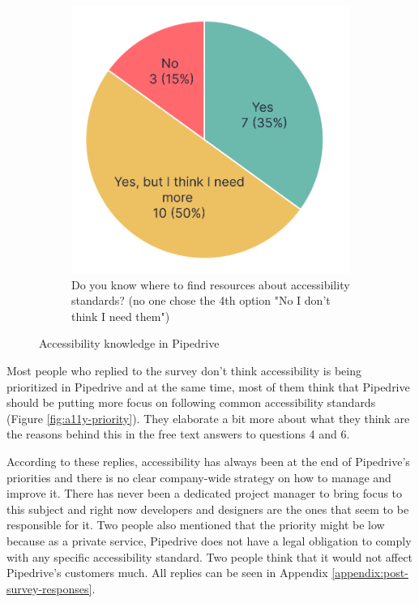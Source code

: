 \documentclass{master_thesis}
\begin{document}
\begin{figure}[H]
\begin{subfigure}{0.4\textwidth}
		\includegraphics[width=\textwidth]{img/a11y-resources.png}
		\caption{Do you know where to find resources
		about accessibility standards? (no one chose the 4th option "No I don't think I need them") }
    	\label{fig:a11y-resources}
	\end{subfigure}
	\caption{Accessibility knowledge in Pipedrive}
    \label{fig:a11y-knowledge}
\end{figure}

Most people who replied to the survey don't think accessibility is being prioritized in Pipedrive and at the same time, most of them think that Pipedrive should be putting more focus on following common accessibility standards (Figure \ref{fig:a11y-priority}). They elaborate a bit more about what they think are the reasons behind this in the free text answers to questions 4 and 6.

According to these replies, accessibility has always been at the end of Pipedrive's priorities and there is no clear company-wide strategy on how to manage and improve it. There has never been a dedicated project manager to bring focus to this subject
and right now developers and designers are the ones that seem to be responsible for it. Two people also mentioned that the priority might be low because as a private service, Pipedrive does not have a legal obligation to comply with any specific accessibility standard. Two people think that it would not affect Pipedrive's customers much. All replies can be seen in  Appendix \ref{appendix:post-survey-responses}.
\end{document}
